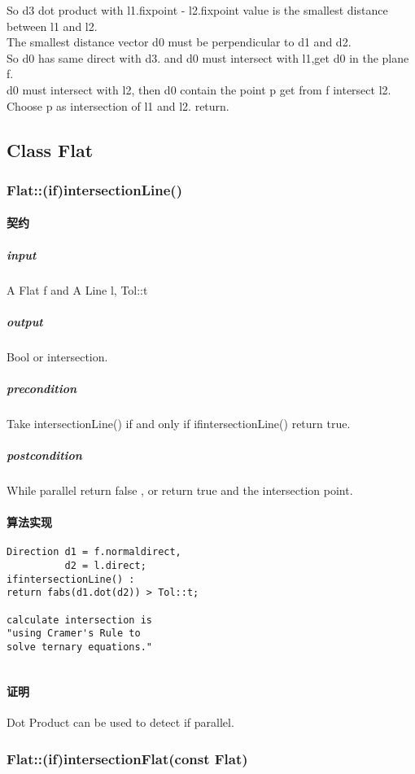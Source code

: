 \documentclass[a4paper]{book}
\numberwithin{equation}{chapter}
\theoremstyle{definition}
\begin{document}
\begin{multicols}{2}
So d3 dot product with l1.fixpoint - l2.fixpoint value is the smallest distance between l1 and l2. \\

The smallest distance vector d0 must be perpendicular to d1 and d2. \\

So d0 has same direct with d3.
and d0 must intersect with l1,get d0 in the plane f. \\

d0 must intersect with l2, then d0 contain the point p get from f intersect l2. \\

Choose p as intersection of l1 and l2. return.


\subsection{Class Flat}

\subsubsection{Flat::(if)intersectionLine()}
\paragraph{契约}
\subparagraph{input}
A Flat f and A Line l, Tol::t
\subparagraph{output}
Bool or intersection.
\subparagraph{precondition}
Take intersectionLine() if and only if ifintersectionLine() return true.
\subparagraph{postcondition}
While parallel return false , or return true and the intersection point.
\paragraph{算法实现}
\begin{lstlisting}
Direction d1 = f.normaldirect,
          d2 = l.direct;
ifintersectionLine() : 
return fabs(d1.dot(d2)) > Tol::t;

calculate intersection is 
"using Cramer's Rule to 
solve ternary equations."


\end{lstlisting}
\paragraph{证明}
Dot Product can be used to detect if parallel.


\subsubsection{Flat::(if)intersectionFlat(const Flat)}

\end{multicols}
\end{document}
